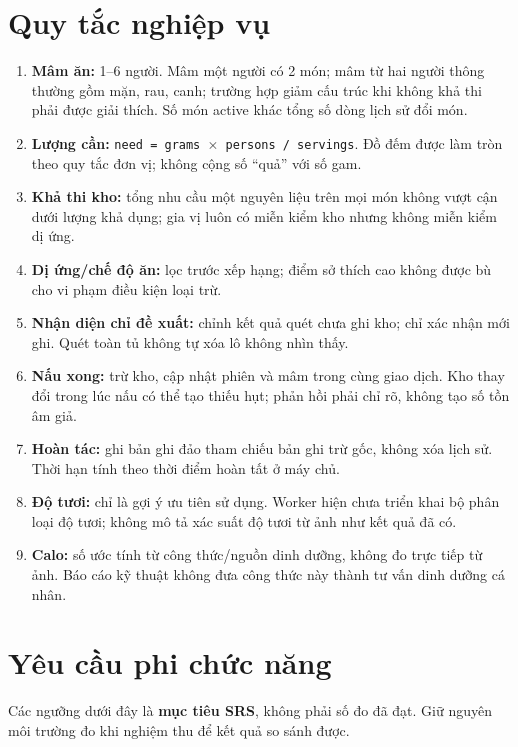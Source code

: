 \section{Quy tắc nghiệp vụ}
\begin{enumerate}
\item \textbf{Mâm ăn:} 1--6 người. Mâm một người có 2 món; mâm từ hai người thông thường gồm mặn, rau, canh; trường hợp giảm cấu trúc khi không khả thi phải được giải thích. Số món active khác tổng số dòng lịch sử đổi món.
\item \textbf{Lượng cần:} {\small\texttt{need = grams \ensuremath{\times} persons /\allowbreak{}\allowbreak{} servings}}. Đồ đếm được làm tròn theo quy tắc đơn vị; không cộng số ``quả'' với số gam.
\item \textbf{Khả thi kho:} tổng nhu cầu một nguyên liệu trên mọi món không vượt cận dưới lượng khả dụng; gia vị luôn có miễn kiểm kho nhưng không miễn kiểm dị ứng.
\item \textbf{Dị ứng/\allowbreak{}chế độ ăn:} lọc trước xếp hạng; điểm sở thích cao không được bù cho vi phạm điều kiện loại trừ.
\item \textbf{Nhận diện chỉ đề xuất:} chỉnh kết quả quét chưa ghi kho; chỉ xác nhận mới ghi. Quét toàn tủ không tự xóa lô không nhìn thấy.
\item \textbf{Nấu xong:} trừ kho, cập nhật phiên và mâm trong cùng giao dịch. Kho thay đổi trong lúc nấu có thể tạo thiếu hụt; phản hồi phải chỉ rõ, không tạo số tồn âm giả.
\item \textbf{Hoàn tác:} ghi bản ghi đảo tham chiếu bản ghi trừ gốc, không xóa lịch sử. Thời hạn tính theo thời điểm hoàn tất ở máy chủ.
\item \textbf{Độ tươi:} chỉ là gợi ý ưu tiên sử dụng. Worker hiện chưa triển khai bộ phân loại độ tươi; không mô tả xác suất độ tươi từ ảnh như kết quả đã có.
\item \textbf{Calo:} số ước tính từ công thức/\allowbreak{}nguồn dinh dưỡng, không đo trực tiếp từ ảnh. Báo cáo kỹ thuật không đưa công thức này thành tư vấn dinh dưỡng cá nhân.
\end{enumerate}
\section{Yêu cầu phi chức năng}
Các ngưỡng dưới đây là \textbf{mục tiêu SRS}, không phải số đo đã đạt. Giữ nguyên môi trường đo khi nghiệm thu để kết quả so sánh được.

